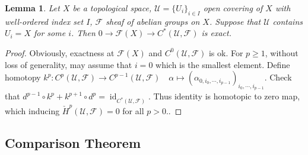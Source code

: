 \documentclass{ctexart}
\newtheorem{lemma}{Lemma}[section]
\newcommand{\identity}{\operatorname{id}}
\begin{document}
\begin{lemma}
    Let $X$ be a topological space, $\mathcal{U} = \{U_{i}\}_{i\in I}$ open covering of $X$ with well-ordered index set $I$, $\mathcal{F}$ sheaf of abelian groups on $X$.
    Suppose that $\mathcal{U}$ contains $U_{i} = X$ for some $i$.
    Then $0 \longrightarrow \mathcal{F}(X) \longrightarrow C^{\ast}(\mathcal{U}, \mathcal{F})$ is exact.
    \label{Lemma 7.5}
\end{lemma}
\begin{proof}
    Obviously, exactness at $\mathcal{F}(X)$ and $C^{0}(\mathcal{U}, \mathcal{F})$ is ok.
    For $p \ge 1$, without loss of generality, may assume that $i = 0$ which is the smallest element.
    Define homotopy $k^{p}: C^{p}(\mathcal{U}, \mathcal{F}) \longrightarrow C^{p - 1}(\mathcal{U}, \mathcal{F})\quad \alpha \longmapsto (\alpha_{0, i_{0}, \cdots, i_{p - 1}})_{i_{0}, \cdots, i_{p - 1}}$.
    Check that $d^{p - 1} \circ k^{p} + k^{p + 1} \circ d^{p} = \identity_{C^{\ast}(\mathcal{U}, \mathcal{F})}$.
    Thus identity is homotopic to zero map, which inducing $\check{H}^{p}(\mathcal{U}, \mathcal{F}) = 0$ for all $p > 0$.. 
\end{proof}

\subsection{Comparison Theorem}
\label{subsection:Sheaf_Cohomology_Comparison_Theorem}
\end{document}
